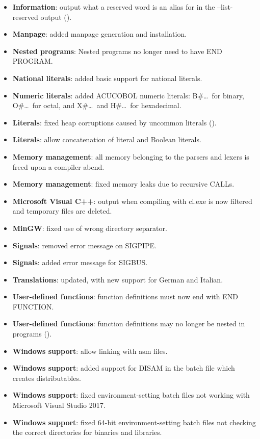 \begin{itemize}
\item \textbf{Information}: output what a reserved word is an alias for in the --list-reserved output ().
\item \textbf{Manpage}: added manpage generation and installation.
\item \textbf{Nested programs}: Nested programs no longer need to have END PROGRAM.
\item \textbf{National literals}: added basic support for national literals.
\item \textbf{Numeric literals}: added ACUCOBOL numeric literals: B\#\ldots\, for binary, O\#\ldots\, for octal, and X\#\ldots\ and H\#\ldots\, for hexadecimal.
\item \textbf{Literals}: fixed heap corruptions caused by uncommon literals ().
\item \textbf{Literals}: allow concatenation of literal and Boolean literals.
\item \textbf{Memory management}: all memory belonging to the parsers and lexers is freed upon a compiler abend.
\item \textbf{Memory management}: fixed memory leaks due to recursive CALLs.
\item \textbf{Microsoft Visual C++}: output when compiling with cl.exe is now filtered and temporary files are deleted.
\item \textbf{MinGW}: fixed use of wrong directory separator.
\item \textbf{Signals}: removed error message on SIGPIPE.
\item \textbf{Signals}: added error message for SIGBUS.
\item \textbf{Translations}: updated, with new support for German and Italian.
\item \textbf{User-defined functions}: function definitions must now end with END FUNCTION.
\item \textbf{User-defined functions}: function definitions may no longer be nested in programs ().
\item \textbf{Windows support}: allow linking with asm files.
\item \textbf{Windows support}: added support for DISAM in the batch file which creates distributables.
\item \textbf{Windows support}: fixed environment-setting batch files not working with Microsoft Visual Studio 2017.
\item \textbf{Windows support}: fixed 64-bit environment-setting batch files not checking the correct directories for binaries and libraries.
\end{itemize}

